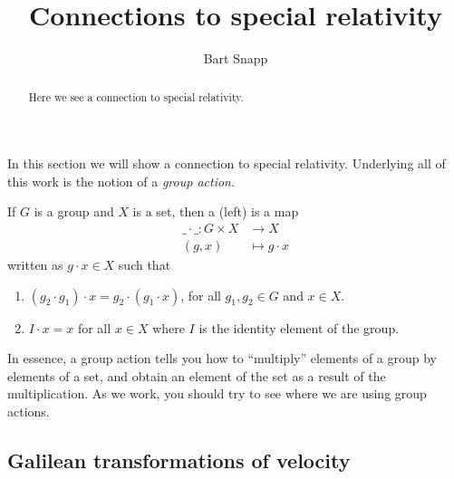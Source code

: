 \documentclass[12pt,noauthor,nooutcomes,handout,newpage]{ximera}
\author{Bart Snapp}
\title{Connections to special relativity}
\begin{document}
\begin{abstract}
Here we see a connection to special relativity.
\end{abstract}
\maketitle

In this section we will show a connection to special
relativity. Underlying all of this work is the notion of a
\textit{group action}.

\begin{definition}
  If $G$ is a group and $X$ is a set, then a (left)  is a map
  \begin{align*}
    \_\cdot\_: G\times X &\to X\\
    (g,x) &\mapsto g\cdot x
  \end{align*}
  written as $g\cdot x \in X$ such that
  \begin{enumerate}
  \item $(g_2\cdot g_1)\cdot x = g_2\cdot (g_1\cdot x)$, for all $g_1,
    g_2\in G$ and $x\in X$.
  \item $I\cdot x = x$ for all $x\in X$ where $I$ is the identity
    element of the group.
  \end{enumerate}
\end{definition}
In essence, a group action tells you how to ``multiply'' elements of a
group by elements of a set, and obtain an element of the set as a
result of the multiplication. As we work, you should try to see where
we are using group actions.

\subsection{Galilean transformations of velocity}
\end{document}
